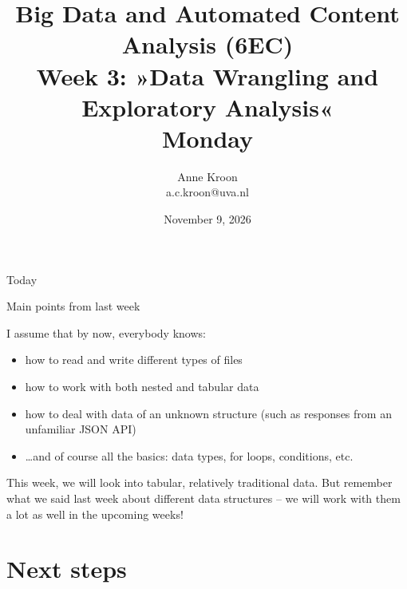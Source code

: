 \documentclass[compress]{beamer}
\begin{document}
\title[Big Data and Automated Content Analysis]{\textbf{Big Data and Automated Content Analysis (6EC)} 
\\Week 3: »Data Wrangling and Exploratory Analysis«
\\Monday}
\author[Anne Kroon]{Anne Kroon\\ \footnotesize{a.c.kroon@uva.nl \\}}
\date{November 9, 2026}

\begin{frame}{}
	\titlepage
\end{frame}

\begin{frame}{Today}
	\tableofcontents
\end{frame}


\begin{frame}{Main points from last week}

\begin{alertblock}{I assume that by now, everybody knows:}
\begin{itemize}
\item how to read and write different types of files
\item how to work with both nested and tabular data
\item how to deal with data of an unknown structure (such as responses from an unfamiliar JSON API)
\item \ldots and of course all the basics: data types, for loops, conditions, etc.
\end{itemize}
\end{alertblock}
\end{frame}

\begin{frame}[standout]
This week, we will look into tabular, relatively traditional data. But remember what we said last week about different data structures -- we will work with them a lot as well in the upcoming weeks!
\end{frame}

\def\SkipPandasCopyReference{}






\section{Next steps}
\end{document}
